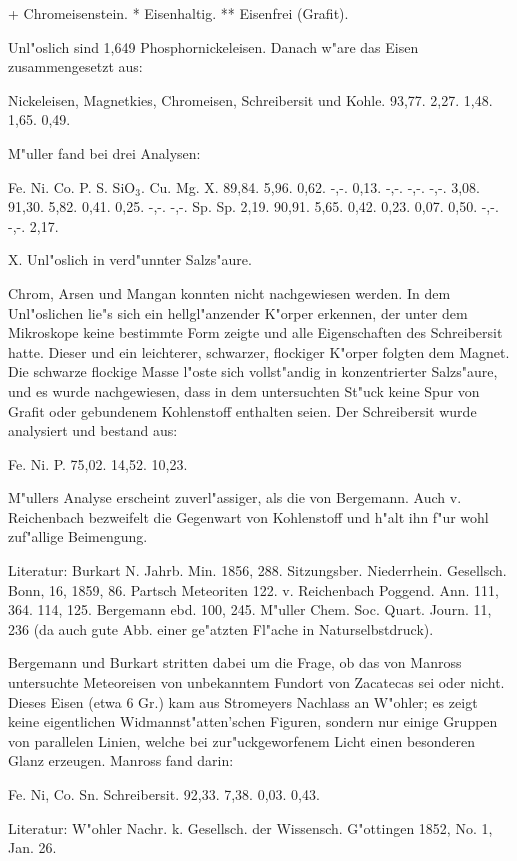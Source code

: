 \documentclass[a4paper, 11pt, oneside]{article}
\begin{document}
+ Chromeisenstein.  
* Eisenhaltig.  
** Eisenfrei (Grafit).

Unl"oslich sind 1,649 Phosphornickeleisen. Danach w"are das Eisen zusammengesetzt aus:

Nickeleisen, Magnetkies, Chromeisen, Schreibersit und Kohle.  
93,77. 2,27. 1,48. 1,65. 0,49.

M"uller fand bei drei Analysen:

Fe. Ni. Co. P. S. SiO$_{3}$. Cu. Mg. X.  
89,84. 5,96. 0,62. -,-. 0,13. -,-. -,-. -,-. 3,08.  
91,30. 5,82. 0,41. 0,25. -,-. -,-. Sp. Sp. 2,19.  
90,91. 5,65. 0,42. 0,23. 0,07. 0,50. -,-. -,-. 2,17.

X. Unl"oslich in verd"unnter Salzs"aure.

Chrom, Arsen und Mangan konnten nicht nachgewiesen werden. In dem Unl"oslichen lie"s sich ein hellgl"anzender K"orper erkennen, der unter dem Mikroskope keine bestimmte Form zeigte und alle Eigenschaften des Schreibersit hatte. Dieser und ein leichterer, schwarzer, flockiger K"orper folgten dem Magnet. Die schwarze flockige Masse l"oste sich vollst"andig in konzentrierter Salzs"aure, und es wurde nachgewiesen, dass in dem untersuchten St"uck keine Spur von Grafit oder gebundenem Kohlenstoff enthalten seien. Der Schreibersit wurde analysiert und bestand aus:

Fe. Ni. P.  
75,02. 14,52. 10,23.

M"ullers Analyse erscheint zuverl"assiger, als die von Bergemann. Auch v. Reichenbach bezweifelt die Gegenwart von Kohlenstoff und h"alt ihn f"ur wohl zuf"allige Beimengung.

Literatur: Burkart N. Jahrb. Min. 1856, 288. Sitzungsber. Niederrhein. Gesellsch. Bonn, 16, 1859, 86. Partsch Meteoriten 122. v. Reichenbach Poggend. Ann. 111, 364. 114, 125. Bergemann ebd. 100, 245. M"uller Chem. Soc. Quart. Journ. 11, 236 (da auch gute Abb. einer ge"atzten Fl"ache in Naturselbstdruck).

Bergemann und Burkart stritten dabei um die Frage, ob das von Manross untersuchte Meteoreisen von unbekanntem Fundort von Zacatecas sei oder nicht. Dieses Eisen (etwa 6 Gr.) kam aus Stromeyers Nachlass an W"ohler; es zeigt keine eigentlichen Widmannst"atten'schen Figuren, sondern nur einige Gruppen von parallelen Linien, welche bei zur"uckgeworfenem Licht einen besonderen Glanz erzeugen. Manross fand darin:

Fe. Ni, Co. Sn. Schreibersit.  
92,33. 7,38. 0,03. 0,43.

Literatur: W"ohler Nachr. k. Gesellsch. der Wissensch. G"ottingen 1852, No. 1, Jan. 26.
\end{document}
